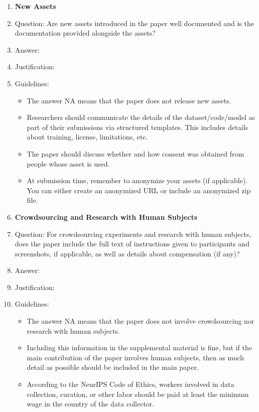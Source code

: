\documentclass{article}
\begin{document}
\begin{enumerate}
\item {\bf New Assets}
    \item[] Question: Are new assets introduced in the paper well documented and is the documentation provided alongside the assets?
    \item[] Answer: \answerTODO{} %
    \item[] Justification: \justificationTODO{}
    \item[] Guidelines:
    \begin{itemize}
        \item The answer NA means that the paper does not release new assets.
        \item Researchers should communicate the details of the dataset/code/model as part of their submissions via structured templates. This includes details about training, license, limitations, etc. 
        \item The paper should discuss whether and how consent was obtained from people whose asset is used.
        \item At submission time, remember to anonymize your assets (if applicable). You can either create an anonymized URL or include an anonymized zip file.
    \end{itemize}

\item {\bf Crowdsourcing and Research with Human Subjects}
    \item[] Question: For crowdsourcing experiments and research with human subjects, does the paper include the full text of instructions given to participants and screenshots, if applicable, as well as details about compensation (if any)? 
    \item[] Answer: \answerTODO{} %
    \item[] Justification: \justificationTODO{}
    \item[] Guidelines:
    \begin{itemize}
        \item The answer NA means that the paper does not involve crowdsourcing nor research with human subjects.
        \item Including this information in the supplemental material is fine, but if the main contribution of the paper involves human subjects, then as much detail as possible should be included in the main paper. 
        \item According to the NeurIPS Code of Ethics, workers involved in data collection, curation, or other labor should be paid at least the minimum wage in the country of the data collector. 
    \end{itemize}


\end{enumerate}
\end{document}
